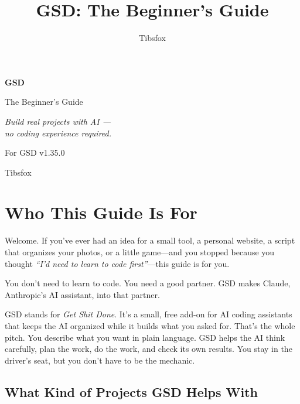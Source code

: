 \documentclass[11pt,letterpaper,openany]{book}
\title{GSD: The Beginner's Guide}
\author{Tibsfox}
\date{}
\begin{document}
\begin{titlepage}
  \centering
  \vspace*{2cm}
  {\headingfont\Huge\bfseries\color{gsdnavy} GSD\par}
  \vspace{0.4cm}
  {\headingfont\LARGE The Beginner's Guide\par}
  \vspace{1.2cm}
  {\large\itshape Build real projects with AI ---\\
  no coding experience required.\par}
  \vspace{2cm}
  {\large For GSD v1.35.0\par}
  \vfill
  {\large Tibsfox\par}
  \vspace{1cm}
  \cclicense
  \vspace{1cm}
\end{titlepage}

\frontmatter
{}
\tableofcontents
\cleardoublepage

\mainmatter
{}

\chapter{Who This Guide Is For}

Welcome. If you've ever had an idea for a small tool, a personal website, a
script that organizes your photos, or a little game---and you stopped because
you thought \emph{``I'd need to learn to code first''}---this guide is for you.

You don't need to learn to code. You need a good partner. GSD makes
Claude, Anthropic's AI assistant, into that partner.

GSD stands for \emph{Get Shit Done}. It's a small, free add-on for AI coding
assistants that keeps the AI organized while it builds what you asked for.
That's the whole pitch. You describe what you want in plain language. GSD
helps the AI think carefully, plan the work, do the work, and check its own
results. You stay in the driver's seat, but you don't have to be the mechanic.

\section{What Kind of Projects GSD Helps With}
\end{document}
